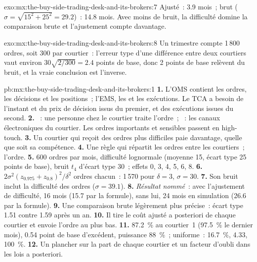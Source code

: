 \begin{solution}{exo:mx:the-buy-side-trading-desk-and-its-brokers:7}
Ajusté~: 3.9 mois~; brut ($\sigma=\sqrt{15^2+25^2}=29.2$)~: 14.8 mois. Avec moins de bruit, la difficulté domine la comparaison brute et l'ajustement
compte davantage.
\end{solution}

\begin{solution}{exo:mx:the-buy-side-trading-desk-and-its-brokers:8}
Un trimestre compte 1\,800 ordres, soit 300 par courtier~: l'erreur type d'une différence entre deux courtiers vaut environ $30\sqrt{2/300}=2.4$ points de base, donc 2
points de base relèvent du bruit, et la vraie conclusion est l'inverse.
\end{solution}

\begin{solution}{pb:mx:the-buy-side-trading-desk-and-its-brokers:1}
\textbf{1.} L'OMS contient les ordres, les décisions et les positions~; l'EMS, les  et les exécutions. Le TCA a besoin de l'instant et du prix de décision issus du premier, et des
exécutions issues du second.
\textbf{2.} ~: une personne chez le courtier traite l'ordre~; ~: les canaux électroniques du courtier. Les ordres importants et sensibles passent en high-touch.
\textbf{3.} Un courtier qui reçoit des ordres plus difficiles paie davantage, quelle que soit sa compétence.
\textbf{4.} Une règle qui répartit les ordres entre les courtiers~; l'ordre.
\textbf{5.} 600 ordres par mois, difficulté lognormale (moyenne 15, écart type 25 points de base), bruit $t_4$ d'écart type 30~; effets 0, 3, 4, 5, 6, 8.
\textbf{6.} $2\sigma^2(z_{0.975}+z_{0.8})^2/\delta^2$ ordres chacun~: 1\,570 pour $\delta=3$, $\sigma=30$.
\textbf{7.} Son bruit inclut la difficulté des ordres ($\sigma=39.1$).
\textbf{8.} \emph{Résultat nommé}~: avec l'ajustement de difficulté, 16 mois (15.7 par la formule), sans lui, 24 mois en simulation (26.6 par la formule).
\textbf{9.} Une comparaison brute légèrement plus précise~: écart type 1.51 contre 1.59 après un an.
\textbf{10.} Il tire le coût ajusté a posteriori de chaque courtier et envoie l'ordre au plus bas.
\textbf{11.} 87.2~\% au courtier~1 (97.5~\% le dernier mois), 0.54 point de base d'excédent, puissance 88~\%~; uniforme~: 16.7~\%, 4.33, 100~\%.
\textbf{12.} Un plancher sur la part de chaque courtier et un facteur d'oubli dans les lois a posteriori.

\end{solution}
